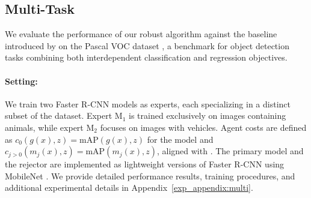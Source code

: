 \subsection{Multi-Task}
We evaluate the performance of our robust \name{} algorithm against the baseline introduced by \citet{montreuil2024twostagelearningtodefermultitasklearning} on the Pascal VOC dataset \citep{pascal}, a benchmark for object detection tasks combining both interdependent classification and regression objectives.
\paragraph{Setting:} We train two Faster R-CNN models \citep{ren2016fasterrcnnrealtimeobject} as experts, each specializing in a distinct subset of the dataset. Expert  M\(_1 \) is trained exclusively on images containing animals, while expert  M\(_2 \) focuses on images with vehicles. Agent costs are defined as \( c_0(g(x), z) = \text{mAP}(g(x), z) \) for the model and \( c_{j > 0}(m_j(x), z) = \text{mAP}(m_j(x), z) \), aligned with \citep{montreuil2024twostagelearningtodefermultitasklearning}. The primary model and the rejector are implemented as lightweight versions of Faster R-CNN using MobileNet \citep{howard2017mobilenetsefficientconvolutionalneural}. We provide detailed performance results, training procedures, and additional experimental details in Appendix~\ref{exp_appendix:multi}. 
\begin{table}[ht]\label{table:results_multi}
\centering{}
\caption{Performance comparison of \name{} with the baseline \citep{montreuil2024twostagelearningtodefermultitasklearning} on the Pascal VOC dataset. The table reports mean Average Precision (mAP) under clean and adversarial scenarios.}
\end{table}%
